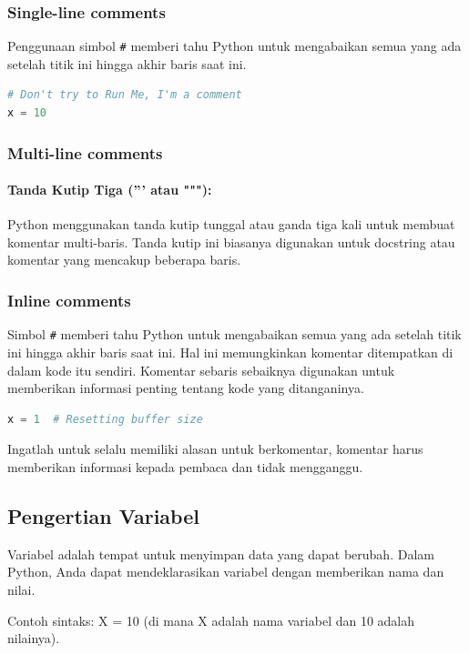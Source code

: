 \documentclass{article}
\begin{document}
\subsubsection{Single-line comments}
Penggunaan simbol \verb|#| memberi tahu Python untuk mengabaikan semua yang ada setelah titik ini hingga akhir baris saat ini.
\begin{lstlisting}[language=Python, caption={}, captionpos=b]
# Don't try to Run Me, I'm a comment
x = 10
\end{lstlisting}

\subsubsection{Multi-line comments}
\paragraph{Tanda Kutip Tiga (''' atau """):} Python menggunakan tanda kutip tunggal atau ganda tiga kali untuk membuat komentar multi-baris. Tanda kutip ini biasanya digunakan untuk docstring atau komentar yang mencakup beberapa baris.

\subsubsection{Inline comments}
Simbol \verb|#| memberi tahu Python untuk mengabaikan semua yang ada setelah titik ini hingga akhir baris saat ini. Hal ini memungkinkan komentar ditempatkan di dalam kode itu sendiri. Komentar sebaris sebaiknya digunakan untuk memberikan informasi penting tentang kode yang ditanganinya.

\begin{lstlisting}[language=Python, caption={}, captionpos=b]
x = 1  # Resetting buffer size
\end{lstlisting}

Ingatlah untuk selalu memiliki alasan untuk berkomentar, komentar harus memberikan informasi kepada pembaca dan tidak mengganggu.

\subsection{Pengertian Variabel}
Variabel adalah tempat untuk menyimpan data yang dapat berubah. Dalam Python, Anda dapat mendeklarasikan variabel dengan memberikan nama dan nilai.

Contoh sintaks: X = 10 (di mana X adalah nama variabel dan 10 adalah nilainya).
\end{document}
